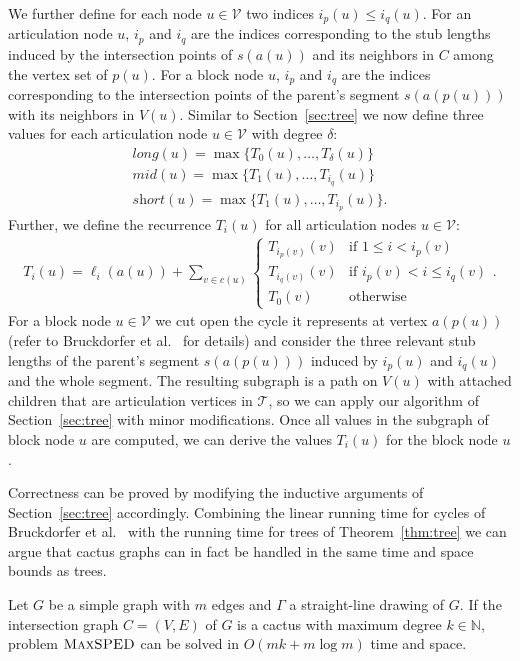\documentclass[a4paper, USenglish]{llncs}
\newcommand{\maxsped}{\ensuremath{\textsc{MaxSPED}}\xspace}
\newcommand{\sollong}{\ensuremath{\textit{long}}\xspace}
\newcommand{\solmid}{\ensuremath{\textit{mid}}\xspace}
\newcommand{\solshort}{\ensuremath{\textit{short}}\xspace}
\begin{document}
	We further define for each node $ u \in \mathcal V $ two indices $ i_p(u) \le i_q(u) $.  
	For an articulation node $u$, $i_p$ and $i_q$ are the indices corresponding to the stub lengths induced by the intersection points of $s(a(u))$ and its neighbors in $C$ among the vertex set of $p(u)$.
	For a block node $u$, $i_p$ and $i_q$ are the indices corresponding to the intersection points of the parent's segment $s(a(p(u)))$ with its neighbors in $V(u)$.
	Similar to Section~\ref{sec:tree} we now define three values for each articulation node $ u \in \mathcal V $ with degree $ \delta $:
	\begin{align*}
	\sollong(u) = \max\{T_0(u),\dots,T_\delta(u)\}\\
	\solmid(u) = \max\{T_1(u),\dots,T_{i_q}(u)\}\\
	\solshort(u) = \max\{T_1(u),\dots,T_{i_p}(u)\}.
	\end{align*}
	Further, we define the recurrence $T_i(u)$ for all articulation nodes $u \in \mathcal V$:
	\begin{align}
	\label{rec:cactus_articulation}
	T_i(u) = \ell_i(a(u)) + \sum_{v \in c(u)}
	\begin{cases}
	T_{i_p(v)}(v) & \text{if } 1 \le i < i_p(v)\\ %
	T_{i_q(v)}(v) & \text{if } i_p(v) < i \leq i_q(v) \\
	T_{0}(v) & \text{otherwise}
	\end{cases}.
	\end{align}
	For a block node $ u \in \mathcal V $ we cut open the cycle it represents at vertex $a(p(u))$ (refer to Bruckdorfer et al.~\cite{bcgkmn-pped-17} for details) and consider the three relevant stub lengths of the parent's segment $s(a(p(u)))$ induced by $i_p(u)$ and $i_q(u)$ and the whole segment. 
	The resulting subgraph is a path on $V(u)$ with attached children that are articulation vertices in $\mathcal T$, so we can apply our algorithm of Section~\ref{sec:tree} with minor modifications.
	Once all values in the subgraph of block node $u$ are computed, we can derive the values $T_i(u)$ for the block node $u$.
	
	Correctness can be proved by modifying the inductive arguments of Section~\ref{sec:tree} accordingly. 
	Combining the linear running time for cycles of Bruckdorfer et al.~\cite{bcgkmn-pped-17} with the running time for trees of Theorem~\ref{thm:tree} we can argue that cactus graphs can in fact be handled in the same time and space bounds as trees.
	
	\begin{theorem}
		Let $ G $ be a simple graph with $m$ edges and $ \Gamma $ a straight-line drawing of $ G $. If the intersection graph $ C = (V,E) $ of $ G $ is a cactus with maximum degree $ k \in \mathbb{N} $, problem \maxsped can be solved in $ O(mk + m \log m) $ time and space.
	\end{theorem}
	
	
\end{document}
